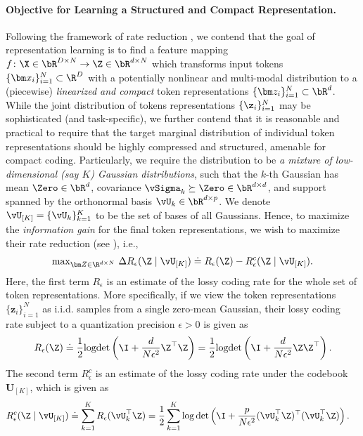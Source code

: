 \documentclass[../../book-main.tex]{subfiles}
\begin{document}
\paragraph{Objective for Learning a Structured and Compact Representation.}
Following the framework of rate reduction , we contend
that the goal of representation learning is to find a feature mapping \(f
\colon \X \in \bR^{D \times N} \to \Z\in \bR^{d \times N}\) which transforms input tokens \(\{\bm x_i\}_{i=1}^N \subset \R^D\) with a potentially nonlinear and multi-modal distribution to a (piecewise) \textit{linearized and compact} token representations \(\{\bm z_i\}_{i=1}^N \subset \bR^{d}\). While the joint distribution of tokens representations \(\{\z_{i}\}_{i = 1}^{N}\) may be sophisticated (and task-specific), we further contend that it is reasonable and practical to
require that the target marginal distribution of individual token representations should be highly compressed and structured, amenable for compact coding. Particularly, we require the distribution to be \textit{a mixture of low-dimensional (say \(K\)) Gaussian
distributions}, such that the \(k\)-th Gaussian has mean \(\Zero \in \bR^{d}\), covariance \(\vSigma_{k} \succeq \Zero \in \bR^{d \times d}\), and support spanned by the orthonormal basis \(\vU_{k} \in \bR^{d \times p}\). 
We denote $\vU_{[K]} = \{\vU_k\}_{k=1}^K$ to be the set of bases of all Gaussians. Hence, to maximize the \textit{information gain} \cite{ma2022principles} for the final token representations, we wish to maximize their rate reduction (see ), i.e., 
\begin{align}\label{eq:rate reduction}
    \mathrm{max}_{\bm Z \in \R^{d\times N}}\ \Delta R_{\epsilon}(\Z \mid \vU_{[K]}) \doteq R_{\epsilon}(\Z) - R^c_{\epsilon}(\Z \mid \vU_{[K]}).
\end{align}
Here, the first term $R_{\epsilon}$ is an estimate of the lossy coding rate for the whole set of token representations. More specifically, if we view the token representations $\{\bm z_i\}_{i=1}^N$ as i.i.d. samples from a single zero-mean Gaussian, their lossy coding rate subject to a quantization precision $\epsilon > 0$ is given as
\begin{equation}\label{eq:coding_rate}
    R_{\epsilon}(\Z) \doteq \frac{1}{2}\textrm{logdet}\left(\I + \frac{d}{N\epsilon^{2}}\Z^{\top}\Z\right) = \frac{1}{2}\textrm{logdet}\left(\I + \frac{d}{N\epsilon^{2}}\Z\Z^{\top}\right).
\end{equation}
The second term $R_{\epsilon}^c$ is an estimate of the lossy coding rate under the codebook $\bm U_{[K]}$, which is given as 
\begin{equation}
\begin{aligned}
    R_{\epsilon}^c(\Z \mid \vU_{[K]}) &\doteq \sum_{k=1}^{K}R_{\epsilon}(\vU_k^{\top} \Z) = \frac{1}{2}\sum_{k=1}^{K}\log\det\left(\I +
    \frac{p}{N\epsilon^{2}}(\vU_k^{\top}\Z)^{\top}(\vU_k^{\top}\Z)\right).
\end{aligned}
\label{eq:def-mcr-Rc}
\end{equation}
\end{document}
